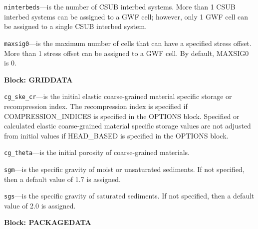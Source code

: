 \begin{description}
\item \texttt{ninterbeds}---is the number of CSUB interbed systems.  More than 1 CSUB interbed systems can be assigned to a GWF cell; however, only 1 GWF cell can be assigned to a single CSUB interbed system.

\item \texttt{maxsig0}---is the maximum number of cells that can have a specified stress offset.  More than 1 stress offset can be assigned to a GWF cell. By default, MAXSIG0 is 0.

\end{description}
\item \textbf{Block: GRIDDATA}

\begin{description}
\item \texttt{cg\_ske\_cr}---is the initial elastic coarse-grained material specific storage or recompression index. The recompression index is specified if COMPRESSION\_INDICES is specified in the OPTIONS block.  Specified or calculated elastic coarse-grained material specific storage values are not adjusted from initial values if HEAD\_BASED is specified in the OPTIONS block.

\item \texttt{cg\_theta}---is the initial porosity of coarse-grained materials.

\item \texttt{sgm}---is the specific gravity of moist or unsaturated sediments.  If not specified, then a default value of 1.7 is assigned.

\item \texttt{sgs}---is the specific gravity of saturated sediments. If not specified, then a default value of 2.0 is assigned.

\end{description}
\item \textbf{Block: PACKAGEDATA}

